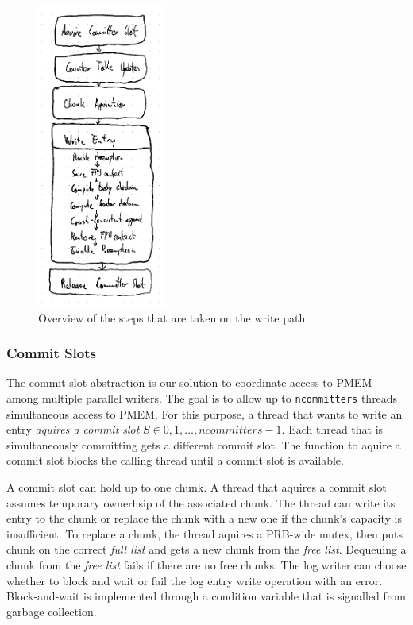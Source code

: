 \documentclass[12pt,a4paper,twoside]{book}
\begin{document}
\begin{figure}[H]
    \centering
    \includegraphics[height=10cm]{fig/prb_writepath_highlevel_activity_diagram}
    \caption{Overview of the steps that are taken on the write path.}
\end{figure}

\subsubsection{Commit Slots}\label{di:prb:write:chunksel}
The commit slot abstraction is our solution to coordinate access to PMEM among multiple parallel writers.
The goal is to allow up to \lstinline{ncommitters} threads simultaneous access to PMEM.
For this purpose, a thread that wants to write an entry \textit{aquires a commit slot} $S \in {0, 1, \dots, ncommitters-1}$.
Each thread that is simultaneously committing gets a different commit slot.
The function to aquire a commit slot blocks the calling thread until a commit slot is available.

A commit slot can hold up to one chunk.
A thread that aquires a commit slot assumes temporary ownerhsip of the associated chunk.
The thread can write its entry to the chunk or replace the chunk with a new one if the chunk's capacity is insufficient.
To replace a chunk, the thread aquires a PRB-wide mutex, then puts chunk on the correct \textit{full list} and gets a new chunk from the \textit{free list}.
Dequeuing a chunk from the \textit{free list} fails if there are no free chunks.
The log writer can choose whether to block and wait or fail the log entry write operation with an error.
Block-and-wait is implemented through a condition variable that is signalled from garbage collection.
\end{document}

